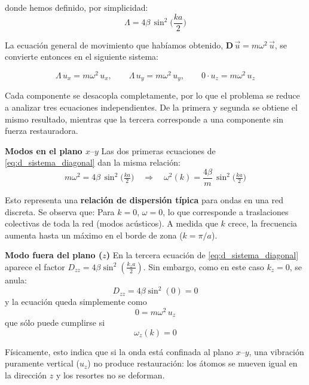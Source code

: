 \documentclass{article}
\begin{document}
donde hemos definido, por simplicidad:
\[
\Lambda = 4\beta\,\sin^2\!\Big(\frac{ka}{2}\Big)
\]

La ecuación general de movimiento que habíamos obtenido, \(\mathbf D\,\vec u = m\omega^2\,\vec u\), se convierte entonces en el siguiente sistema:

\begin{equation}
\Lambda\,u_x = m\omega^2\,u_x,\qquad
\Lambda\,u_y = m\omega^2\,u_y,\qquad
0\cdot u_z = m\omega^2\,u_z
\label{eq:d_sistema_diagonal}
\end{equation}

Cada componente se desacopla completamente, por lo que el problema se reduce a analizar tres ecuaciones independientes.  
De la primera y segunda se obtiene el mismo resultado, mientras que la tercera corresponde a una componente sin fuerza restauradora.

\medskip
\textcolor{Tarawera}{\textbf{Modos en el plano \(x\text{–}y\)}}  
Las dos primeras ecuaciones de \eqref{eq:d_sistema_diagonal} dan la misma relación:
\begin{equation}
m\omega^2 = 4\beta\,\sin^2\!\Big(\tfrac{ka}{2}\Big)
\quad\Longrightarrow\quad
\boxed{\omega^2(k) = \frac{4\beta}{m}\,\sin^2\!\Big(\tfrac{ka}{2}\Big)}
\label{eq:d_dispersion_principal}
\end{equation}

Esto representa una \textbf{relación de dispersión típica} para ondas en una red discreta.  
Se observa que:
Para \(k=0\), \(\omega=0\), lo que corresponde a traslaciones colectivas de toda la red (modos acústicos).
A medida que \(k\) crece, la frecuencia aumenta hasta un máximo en el borde de zona (\(k=\pi/a\)).

\medskip
\textcolor{Tarawera}{\textbf{ Modo fuera del plano (\(z\))}}  
En la tercera ecuación de \eqref{eq:d_sistema_diagonal} aparece el factor \(D_{zz}=4\beta\sin^2(\tfrac{k_z a}{2})\).  
Sin embargo, como en este caso \(k_z=0\), se anula:
\[
D_{zz}=4\beta\sin^2(0)=0
\]
y la ecuación queda simplemente como
\[
0 = m\omega^2\,u_z
\]
que sólo puede cumplirse si
\begin{equation}
\boxed{\omega_z(k)=0}
\label{eq:d_dispersion_z}
\end{equation}

Físicamente, esto indica que si la onda está confinada al plano \(x\text{–}y\), una vibración puramente vertical (\(u_z\)) no produce restauración:  
los átomos se mueven igual en la dirección \(z\) y los resortes no se deforman.
\end{document}
